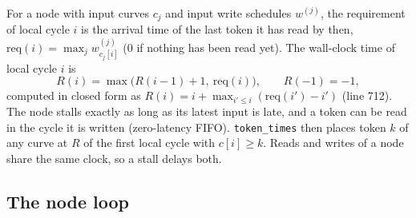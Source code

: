 \documentclass[10pt,a4paper]{article}
\newcommand{\code}[1]{\texttt{#1}}
\begin{document}
For a node with input curves $c_j$ and input write schedules $w^{(j)}$, the
requirement of local cycle $i$ is the arrival time of the last token it has read by then,
$\mathrm{req}(i)=\max_j w^{(j)}_{c_j[i]}$ (0 if nothing has been read yet).
The wall-clock time of local cycle $i$ is
\[
R(i)=\max\bigl(R(i-1)+1,\ \mathrm{req}(i)\bigr),\qquad R(-1)=-1,
\]
computed in closed form as $R(i)=i+\max_{i'\le i}(\mathrm{req}(i')-i')$ (line
712). The node stalls exactly as long as its latest input is late, and a token
can be read in the cycle it is written (zero-latency FIFO). \code{token\_times}
then places token $k$ of any curve at $R$ of the first local cycle with
$c[i]\ge k$. Reads and writes of a node share the same clock, so a stall delays
both.

\subsection{The node loop}
\end{document}
